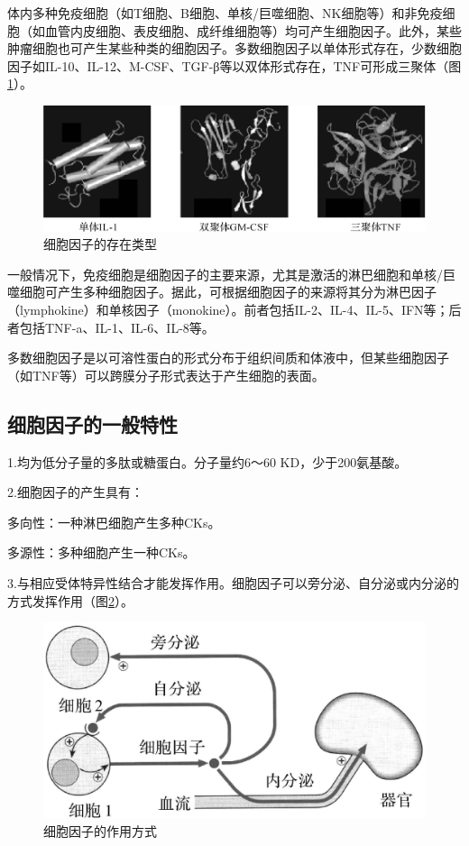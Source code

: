 体内多种免疫细胞（如T细胞、B细胞、单核/巨噬细胞、NK细胞等）和非免疫细胞（如血管内皮细胞、表皮细胞、成纤维细胞等）均可产生细胞因子。此外，某些肿瘤细胞也可产生某些种类的细胞因子。多数细胞因子以单体形式存在，少数细胞因子如IL-10、IL-12、M-CSF、TGF-β等以双体形式存在，TNF可形成三聚体（图\ref{fig6-1}）。

\begin{figure}[!htbp]
 \centering
 \includegraphics{./images/Image00091.jpg}
 \captionsetup{justification=centering}
 \caption{细胞因子的存在类型}
 \label{fig6-1}
  \end{figure} 

一般情况下，免疫细胞是细胞因子的主要来源，尤其是激活的淋巴细胞和单核/巨噬细胞可产生多种细胞因子。据此，可根据细胞因子的来源将其分为淋巴因子（lymphokine）和单核因子（monokine）。前者包括IL-2、IL-4、IL-5、IFN等；后者包括TNF-a、IL-1、IL-6、IL-8等。

多数细胞因子是以可溶性蛋白的形式分布于组织间质和体液中，但某些细胞因子（如TNF等）可以跨膜分子形式表达于产生细胞的表面。


\subsection{细胞因子的一般特性}

1.均为低分子量的多肽或糖蛋白。分子量约6～60 KD，少于200氨基酸。

2.细胞因子的产生具有：

多向性：一种淋巴细胞产生多种CKs。

多源性：多种细胞产生一种CKs。

3.与相应受体特异性结合才能发挥作用。细胞因子可以旁分泌、自分泌或内分泌的方式发挥作用（图\ref{fig6-2}）。

\begin{figure}[!htbp]
 \centering
 \includegraphics{./images/Image00092.jpg}
 \captionsetup{justification=centering}
 \caption{细胞因子的作用方式}
 \label{fig6-2}
  \end{figure} 

